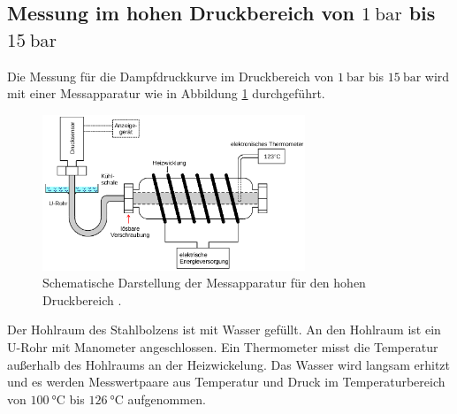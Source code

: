 \subsection{Messung im hohen Druckbereich von $\SI{1}{\bar}$ bis $\SI{15}{\bar}$}
Die Messung für die Dampfdruckkurve im Druckbereich von $\SI{1}{\bar}$ bis
$\SI{15}{\bar}$ wird mit einer Messapparatur wie in Abbildung \ref{fig:messapparatur2}
durchgeführt.
\begin{figure}
  \centering
  \includegraphics[width=0.7\textwidth]{messapparatur2.png}
  \caption{Schematische Darstellung der Messapparatur für den hohen
  Druckbereich \cite{sample}.}
  \label{fig:messapparatur2}
\end{figure}
Der Hohlraum des Stahlbolzens ist mit Wasser gefüllt. An den Hohlraum ist ein
U-Rohr mit Manometer angeschlossen. Ein Thermometer misst die Temperatur außerhalb
des Hohlraums an der Heizwickelung. Das Wasser wird langsam erhitzt und es werden
Messwertpaare aus Temperatur und Druck im Temperaturbereich von $\SI{100}{\celsius}$
bis $\SI{126}{\celsius}$ aufgenommen.
